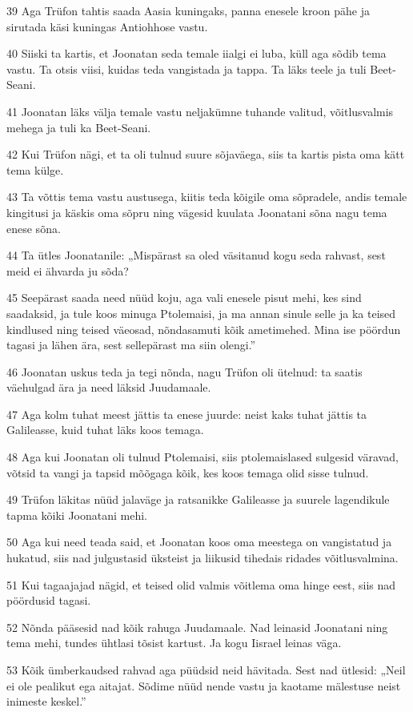 \par 39 Aga Trüfon tahtis saada Aasia kuningaks, panna enesele kroon pähe ja sirutada käsi kuningas Antiohhose vastu.
\par 40 Siiski ta kartis, et Joonatan seda temale iialgi ei luba, küll aga sõdib tema vastu. Ta otsis viisi, kuidas teda vangistada ja tappa. Ta läks teele ja tuli Beet-Seani.
\par 41 Joonatan läks välja temale vastu neljakümne tuhande valitud, võitlusvalmis mehega ja tuli ka Beet-Seani.
\par 42 Kui Trüfon nägi, et ta oli tulnud suure sõjaväega, siis ta kartis pista oma kätt tema külge.
\par 43 Ta võttis tema vastu austusega, kiitis teda kõigile oma sõpradele, andis temale kingitusi ja käskis oma sõpru ning vägesid kuulata Joonatani sõna nagu tema enese sõna.
\par 44 Ta ütles Joonatanile: „Mispärast sa oled väsitanud kogu seda rahvast, sest meid ei ähvarda ju sõda?
\par 45 Seepärast saada need nüüd koju, aga vali enesele pisut mehi, kes sind saadaksid, ja tule koos minuga Ptolemaisi, ja ma annan sinule selle ja ka teised kindlused ning teised väeosad, nõndasamuti kõik ametimehed. Mina ise pöördun tagasi ja lähen ära, sest sellepärast ma siin olengi.”
\par 46 Joonatan uskus teda ja tegi nõnda, nagu Trüfon oli ütelnud: ta saatis väehulgad ära ja need läksid Juudamaale.
\par 47 Aga kolm tuhat meest jättis ta enese juurde: neist kaks tuhat jättis ta Galileasse, kuid tuhat läks koos temaga.
\par 48 Aga kui Joonatan oli tulnud Ptolemaisi, siis ptolemaislased sulgesid väravad, võtsid ta vangi ja tapsid mõõgaga kõik, kes koos temaga olid sisse tulnud.
\par 49 Trüfon läkitas nüüd jalaväge ja ratsanikke Galileasse ja suurele lagendikule tapma kõiki Joonatani mehi.
\par 50 Aga kui need teada said, et Joonatan koos oma meestega on vangistatud ja hukatud, siis nad julgustasid üksteist ja liikusid tihedais ridades võitlusvalmina.
\par 51 Kui tagaajajad nägid, et teised olid valmis võitlema oma hinge eest, siis nad pöördusid tagasi.
\par 52 Nõnda pääsesid nad kõik rahuga Juudamaale. Nad leinasid Joonatani ning tema mehi, tundes ühtlasi tõsist kartust. Ja kogu Iisrael leinas väga.
\par 53 Kõik ümberkaudsed rahvad aga püüdsid neid hävitada. Sest nad ütlesid: „Neil ei ole pealikut ega aitajat. Sõdime nüüd nende vastu ja kaotame mälestuse neist inimeste keskel.”

